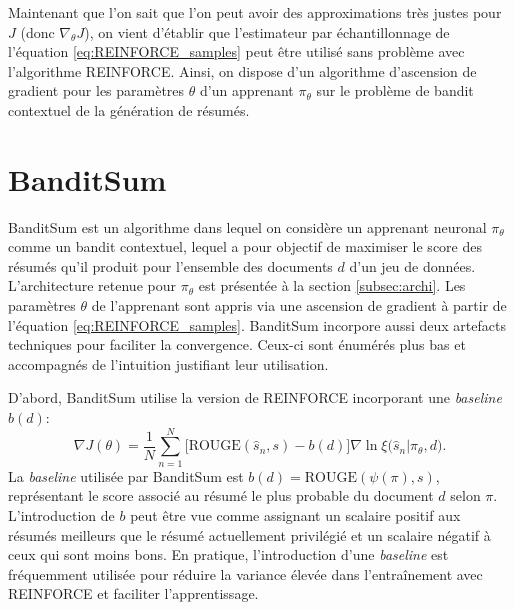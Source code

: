 Maintenant que l'on sait que l'on peut avoir des approximations très justes pour
$J$ (donc $\nabla_\theta J$), on vient d'établir que l'estimateur par échantillonnage 
de l'équation \eqref{eq:REINFORCE_samples} peut être utilisé sans problème 
avec l'algorithme REINFORCE.
Ainsi, on dispose d'un algorithme d'ascension de gradient pour les paramètres
$\theta$ d'un apprenant $\pi_\theta$ sur le problème de bandit contextuel
de la génération de résumés.

\section{BanditSum}

BanditSum est un algorithme dans lequel on considère un apprenant neuronal $\pi_\theta$ 
comme un bandit contextuel,
lequel a pour objectif de maximiser le score des résumés qu'il produit pour l'ensemble 
des documents $d$ d'un jeu de données.
L'architecture retenue pour $\pi_\theta$ est présentée à la section \ref{subsec:archi}.
Les paramètres $\theta$ de l'apprenant sont appris via une ascension de gradient 
à partir de l'équation \eqref{eq:REINFORCE_samples}.
BanditSum incorpore aussi deux artefacts techniques pour faciliter la convergence.
Ceux-ci sont énumérés plus bas et accompagnés de l'intuition justifiant leur 
utilisation.

D'abord, BanditSum utilise la version de REINFORCE incorporant une \textit{baseline} $b(d)$:
\begin{equation*}
    \nabla J(\theta) = \frac{1}{N} \sum_{n=1}^N\big[\text{ROUGE}(\hat{s}_n, s) - b(d)\big]\nabla \ln \xi\big(\hat{s}_n | \pi_\theta, d \big).
    \label{eq:REINFORCE_baseline}
\end{equation*}
La \textit{baseline} utilisée par BanditSum est $b(d) = \text{ROUGE}\left(\psi(\pi), s\right)$, représentant le score associé au résumé
le plus probable du document $d$ selon $\pi$.
L'introduction de $b$ peut être vue comme assignant un scalaire positif 
aux résumés meilleurs que le résumé actuellement privilégié et un scalaire négatif à ceux qui 
sont moins bons.
En pratique, l'introduction d'une \textit{baseline} est fréquemment utilisée pour réduire la variance 
élevée dans l'entraînement avec REINFORCE et faciliter l'apprentissage.

